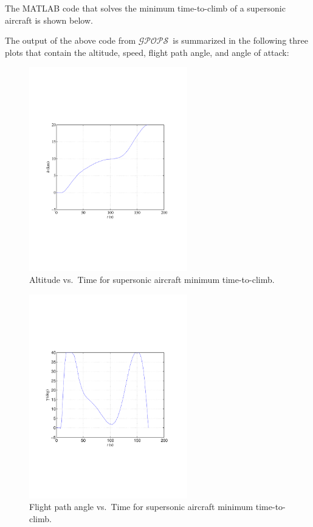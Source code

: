 \documentclass[10pt,final]{report}
\newcommand{\gpops}{$\mathcal{GPOPS}$~}
\newcounter{example}[chapter]
\newenvironment{shadedframe}{%
  \def\FrameCommand{\fcolorbox{black}{shadecolor}}%
  \MakeFramed {\FrameRestore}}
{\endMakeFramed}
\begin{document}
The MATLAB code that solves the minimum time-to-climb of a supersonic
aircraft is shown below.
\footnotesize
\begin{shadedframe}




\end{shadedframe}
\normalsize
The output of the above code from \gpops is summarized in the
following three plots that contain the altitude, speed, flight path
angle, and angle of attack:
\begin{figure}[H]
  \centering
  \includegraphics[height=3.5in]{hvstMinClimb.pdf}
  \caption{Altitude vs.~Time for supersonic aircraft minimum time-to-climb.}
\end{figure}
\begin{figure}[H]
  \centering
  \includegraphics[height=3.5in]{fpavstMinClimb.pdf}
  \caption{Flight path angle vs.~Time for supersonic aircraft minimum time-to-climb.}
\end{figure}
\end{document}
